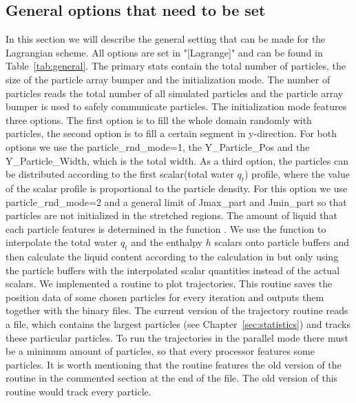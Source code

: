 \documentclass[12pt]{article}
\begin{document}
\subsection{General options that need to be set}
\label{sec:general_main}
In this section we will describe the general setting that can be made for the Lagrangian scheme. All options are set in "[Lagrange]" and can be found in Table~\ref{tab:general}. The primary stats contain the total number of particles, the size of the particle array bumper and the initialization mode. The number of particles reads the total number of all simulated particles and the particle array bumper is used to safely communicate particles. \newline
The initialization mode features three options. The first option is to fill the whole domain randomly with particles, the second option is to fill a certain segment in y-direction. For both options we use the particle\_rnd\_mode=1, the Y\_Particle\_Pos and the Y\_Particle\_Width, which is the total width. As a third option, the particles can be distributed according to the first scalar(total water $q_t$) profile, where the value of the scalar profile is proportional to the particle density. For this option we use particle\_rnd\_mode=2 and a general limit of Jmax\_part and Jmin\_part so that particles are not initialized in the stretched regions.\newline
The amount of liquid that each particle features is determined in the function . We use the function  to interpolate the total water $q_t$ and the enthalpy $h$ scalars onto particle buffers and then calculate the liquid content according to the calculation in  but only using the particle buffers with the interpolated scalar quantities instead of the actual scalars.\newline
We implemented a routine to plot trajectories. This routine saves the position data of some chosen particles for every iteration and outputs them together with the binary files. The current version of the trajectory routine  reads a file, which contains the largest particles (see Chapter~\ref{sec:statistics}) and tracks these particular particles. To run the trajectories in the parallel mode there must be a minimum amount of particles, so that every processor features some particles. It is worth mentioning that the routine features the old version of the routine in the commented section at the end of the file. The old version of this routine would track every particle. \newline 
\end{document}
